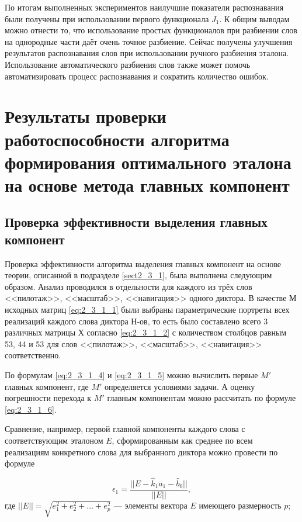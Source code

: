По итогам выполненных экспериментов наилучшие показатели распознавания были получены при использовании первого функционала $J_1$.
К общим выводам можно отнести то, что использование простых функционалов при разбиении слов на однородные части даёт очень точное разбиение.
Сейчас получены улучшения результатов распознавания слов при использовании ручного разбиения эталона.
Использование автоматического разбиения слов также может помочь автоматизировать процесс распознавания и сократить количество ошибок.


\section{Результаты проверки работоспособности алгоритма формирования оптимального эталона на основе метода главных компонент} \label{sect3_3}

\subsection{Проверка эффективности выделения главных компонент} \label{sect3_3_1}

Проверка эффективности алгоритма выделения главных компонент на основе теории, описанной в подразделе \ref{sect2_3_1}, была выполнена следующим образом.
Анализ проводился в отдельности для каждого из трёх слов <<пилотаж>>, <<масштаб>>, <<навигация>> одного диктора.
В качестве $М$ исходных матриц \eqref{eq:2_3_1_1} были выбраны параметрические портреты всех реализаций каждого слова диктора Н-ов, то есть было составлено всего 3 различных матрицы $Х$ согласно \eqref{eq:2_3_1_2} с количеством столбцов равным 53, 44 и 53 для слов <<пилотаж>>, <<масштаб>>, <<навигация>> соответственно.

По формулам \eqref{eq:2_3_1_4} и \eqref{eq:2_3_1_5} можно вычислить первые $M'$ главных компонент, где $M'$ определяется условиями задачи. 
А оценку погрешности перехода к $M'$ главным компонентам можно рассчитать по формуле \eqref{eq:2_3_1_6}.

Сравнение, например, первой главной компоненты каждого слова с соответствующим эталоном $E$, сформированным как среднее по всем реализациям конкретного слова для выбранного диктора можно провести по формуле 

\begin{equation} \label{eq:3_3_1_1}
\epsilon_1 = \frac{||E - \widehat{k}_1 a_1 - \widehat{b}_0||}{||E||},
\end{equation}
где $||E|| = \sqrt{e_1^2 + e_2^2 + \dots + e_p^2}$ --- элементы вектора $E$ имеющего размерность $p$;


